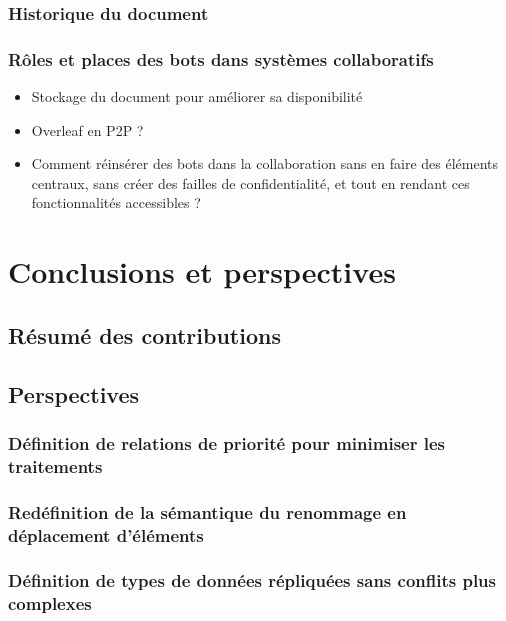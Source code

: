 \documentclass[12pt]{thesul}
\begin{document}
\subsection{Historique du document}
\subsection{Rôles et places des bots dans systèmes collaboratifs}
\begin{itemize}
  \item Stockage du document pour améliorer sa disponibilité
  \item Overleaf en P2P ?
  \item Comment réinsérer des bots dans la collaboration sans en faire des éléments centraux, sans créer des failles de confidentialité, et tout en rendant ces fonctionnalités accessibles ?
\end{itemize}

\NumberThisInToc
\chapter{Conclusions et perspectives}
\minitoc
\section{Résumé des contributions}
\section{Perspectives}
\subsection{Définition de relations de priorité pour minimiser les traitements}
\subsection{Redéfinition de la sémantique du renommage en déplacement d'éléments}
\subsection{Définition de types de données répliquées sans conflits plus complexes}
% 

% 

\label{app:rename-id}
\end{document}

